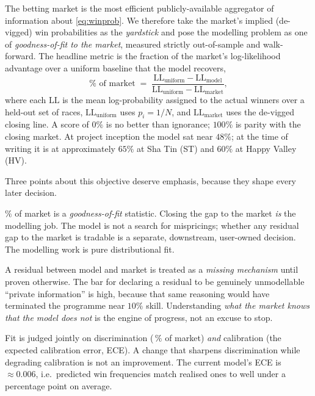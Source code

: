 The betting market is the most efficient publicly-available aggregator of information about
\eqref{eq:winprob}. We therefore take the market's implied (de-vigged) win probabilities as the
\emph{yardstick} and pose the modelling problem as one of \emph{goodness-of-fit to the market},
measured strictly out-of-sample and walk-forward. The headline metric is the fraction of the
market's log-likelihood advantage over a uniform baseline that the model recovers,
\begin{equation}
  \%\text{ of market} \;=\;
   \frac{\mathrm{LL}_{\text{uniform}} - \mathrm{LL}_{\text{model}}}
        {\mathrm{LL}_{\text{uniform}} - \mathrm{LL}_{\text{market}}},
  \label{eq:pctmarket}
\end{equation}
where each $\mathrm{LL}$ is the mean log-probability assigned to the actual winners over a held-out
set of races, $\mathrm{LL}_{\text{uniform}}$ uses $p_i = 1/N$, and $\mathrm{LL}_{\text{market}}$
uses the de-vigged closing line. A score of $0\%$ is no better than ignorance; $100\%$ is parity
with the closing market. At project inception the model sat near $48\%$; at the time of writing it
is at approximately $65\%$ at Sha Tin (ST) and $60\%$ at Happy Valley (HV).

Three points about this objective deserve emphasis, because they shape every later decision.

\begin{principle}
$\%$ of market is a \emph{goodness-of-fit} statistic. Closing the gap to the market \emph{is}
the modelling job. The model is not a search for mispricings; whether any residual gap to the
market is tradable is a separate, downstream, user-owned decision. The modelling work is pure
distributional fit.
\end{principle}

\begin{principle}
A residual between model and market is treated as a \emph{missing mechanism} until proven
otherwise. The bar for declaring a residual to be genuinely unmodellable ``private information''
is high, because that same reasoning would have terminated the programme near $10\%$ skill.
Understanding \emph{what the market knows that the model does not} is the engine of progress, not
an excuse to stop.
\end{principle}

\begin{principle}
Fit is judged jointly on discrimination (\,$\%$ of market) \emph{and} calibration (the expected
calibration error, ECE). A change that sharpens discrimination while degrading calibration is not
an improvement. The current model's ECE is $\approx 0.006$, i.e.\ predicted win frequencies match
realised ones to well under a percentage point on average.
\end{principle}

